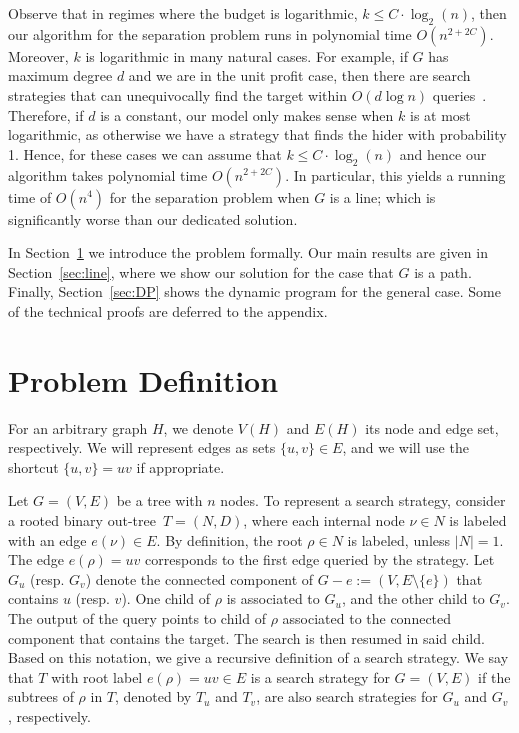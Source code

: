 \documentclass[11pt]{article}
\newcommand\+{\mkern2mu}
\newcommand{\T}{T}
\begin{document}
Observe that in regimes where the budget is logarithmic, $k\le C\cdot \log_2(n)$, then our algorithm for the separation problem runs in polynomial time $O(n^{2+2C})$. Moreover, $k$ is logarithmic in many natural cases. For example, if $G$ has maximum degree $d$ and we are in the unit profit case, then there are search strategies that can unequivocally find the target within $ O(d\log n)$ queries~\cite{ben-asher_cost_1997,emamjomeh-zadeh_deterministic_2016}. Therefore, if $d$ is a constant, our model only makes sense when $k$ is at most logarithmic, as otherwise we have a strategy that finds the hider with probability 1. Hence, for these cases we can assume that $k\le C\cdot \log_2(n)$ and hence our algorithm takes polynomial time $O(n^{2+2C})$. In particular, this yields a running time of $O(n^4)$ for the separation problem when $G$ is a line; which is significantly worse than our dedicated solution.

In Section~\ref{sec:ProbDef} we introduce the problem formally. Our main results are given in Section~\ref{sec:line}, where we show our solution for the case that $G$ is a path. Finally, Section~\ref{sec:DP} shows the dynamic program for the general case. Some of the technical proofs are deferred to the appendix.

\section{Problem Definition }
\label{sec:ProbDef}

For an arbitrary graph $H$, we denote $V(H)$ and $E(H)$ its node and edge set, respectively. We will represent edges as sets $\{u,v\}\in E$, and we will use the shortcut $\{u,v\}=uv$ if appropriate.

Let $G=(V,E)$ be a tree with $n$ nodes. To represent a search strategy, consider a rooted binary out-tree~$\T=(N,D)$, where each internal node $\nu \in N$ is labeled with an edge $e(\nu) \in E$. By definition, the root $\rho\in N$ is labeled, unless $|N|=1$. The edge $e(\rho)=uv$  corresponds to the first edge queried by the strategy. Let $G_u$ (resp. $G_v$) denote the connected component of $G - e := (V,E\setminus \{e\})$ that contains $u$ (resp. $v$). One child of $\rho$ is associated to $G_u$, and the other child to $G_v$. 
The output of the query points to child of $\rho$ associated to the connected component that contains the target. The search is then resumed in said child.
Based on this notation, we give a recursive definition of a search strategy. We say that $\T$ with root label $e(\rho)=uv\in E$ is a search strategy for $G=(V,E)$ if the subtrees of $\rho$ in $\T$, denoted by $T_u$ and $T_v$, are also search strategies for $G_u$ and $G_v$, respectively.
\end{document}
